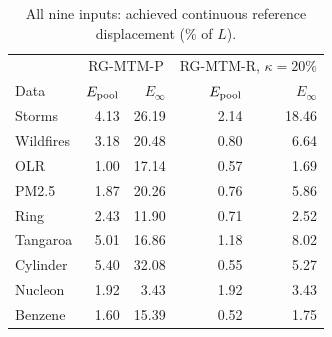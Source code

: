 \begin{table}[t]
\caption{All nine inputs: achieved continuous reference displacement (\% of $L$).}\label{tab:achieved_main}
\centering\footnotesize\begin{tabular}{lrrrr}\toprule
 & \multicolumn{2}{c}{RG-MTM-P} & \multicolumn{2}{c}{RG-MTM-R, $\kappa=20\%$}\\
Data & $E_{\rm pool}$ & $E_\infty$ & $E_{\rm pool}$ & $E_\infty$\\\midrule
Storms & 4.13 & 26.19 & 2.14 & 18.46\\
Wildfires & 3.18 & 20.48 & 0.80 & 6.64\\
OLR & 1.00 & 17.14 & 0.57 & 1.69\\
PM2.5 & 1.87 & 20.26 & 0.76 & 5.86\\
Ring & 2.43 & 11.90 & 0.71 & 2.52\\
Tangaroa & 5.01 & 16.86 & 1.18 & 8.02\\
Cylinder & 5.40 & 32.08 & 0.55 & 5.27\\
Nucleon & 1.92 & 3.43 & 1.92 & 3.43\\
Benzene & 1.60 & 15.39 & 0.52 & 1.75\\
\bottomrule\end{tabular}
\par{}
\end{table}
